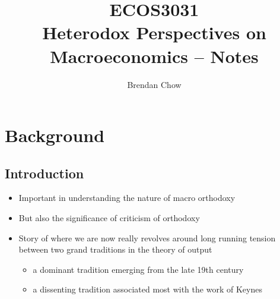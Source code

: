 \documentclass{article}
\begin{document}
	\title{{ECOS3031}\\{\normalsize{Heterodox Perspectives on Macroeconomics -- Notes}}}
	\author{Brendan Chow}
	\maketitle
	\newpage
	\pagestyle{fancynotes}
\section{Background}
\subsection{Introduction}
	\begin{itemize}
		\item Important in understanding the nature of macro orthodoxy
		\item But also the significance of criticism of orthodoxy
		\item Story of where we are now really revolves around long running tension between two grand traditions in the theory of output
		\begin{itemize}
			\item a dominant tradition emerging from the late 19th century
			\item a dissenting tradition associated most with the work of Keynes
		\end{itemize}
	\end{itemize}
\end{document}
